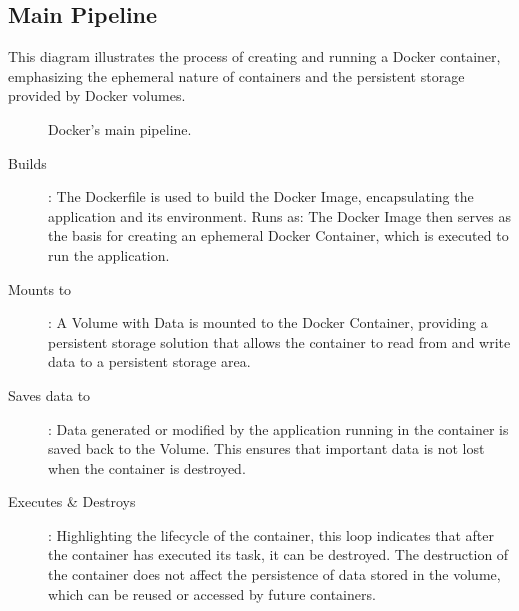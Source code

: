 \documentclass{article}
\begin{document}
\subsection{Main Pipeline}
This diagram illustrates the process of creating and running a Docker container, emphasizing the ephemeral nature of containers and the persistent storage provided by Docker volumes.

\begin{figure}
\caption{Docker's main pipeline.}
\end{figure}

\begin{description}
\item[Builds]: The Dockerfile is used to build the Docker Image, encapsulating the application and its environment.
Runs as: The Docker Image then serves as the basis for creating an ephemeral Docker Container, which is executed to run the application.
\item[Mounts to]: A Volume with Data is mounted to the Docker Container, providing a persistent storage solution that allows the container to read from and write data to a persistent storage area.
\item[Saves data to]: Data generated or modified by the application running in the container is saved back to the Volume. This ensures that important data is not lost when the container is destroyed.
\item[Executes \& Destroys]: Highlighting the lifecycle of the container, this loop indicates that after the container has executed its task, it can be destroyed. The destruction of the container does not affect the persistence of data stored in the volume, which can be reused or accessed by future containers.
\end{description}
\end{document}
